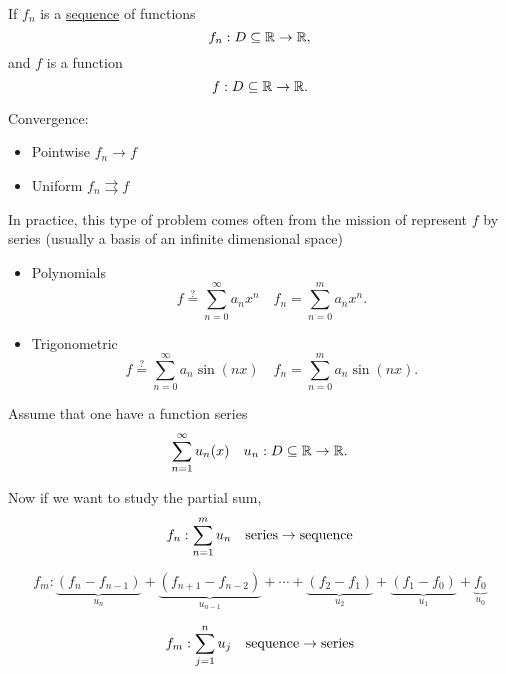 \documentclass[11pt, sakura, night, 0.5in]{hw}
\begin{document}
\coverpage



If $f_n$ is a \underline{sequence} of functions \[f_n: D\subseteq \mathbb{R}\to\mathbb{R},\] and $f$ is a function \[f: D\subseteq \mathbb{R}\to\mathbb{R}.\]

Convergence:
\begin{itemize}
    \item Pointwise $f_n\to f$
    \item Uniform $f_n\rightrightarrows f$
\end{itemize}

In practice, this type of problem comes often from the mission of represent $f$ by series (usually a basis of an infinite dimensional space)


\begin{itemize}
    \item Polynomials \[f \stackrel{?}{=} \sum_{n=0}^\infty a_n x^n\quad f_n = \sum_{n=0}^m a_n x^n.\]
    \item Trigonometric \[f\stackrel{?}{=} \sum_{n=0}^\infty a_n \sin(nx)\quad f_n=\sum_{n=0}^m a_n\sin(nx).\]
\end{itemize}

Assume that one have a function series \[\sum_{n=1}^\infty u_n(x)\quad u_n:D\subseteq\mathbb{R}\to\mathbb{R}.\]

Now if we want to study the partial sum, \[f_n:\sum_{n=1}^m u_n\quad \text{series}\to\text{sequence}\]

\[f_m: \underbrace{(f_n-f_{n-1})}_{u_n} + \underbrace{(f_{n+1}-f_{n-2})}_{u_{n-1}} +\cdots+\underbrace{(f_2-f_1)}_{u_2}+\underbrace{(f_1-f_0)}_{u_1}+\underbrace{f_0}_{u_0}\]

\[f_m:\sum_{j=1}^n u_j\quad\text{sequence}\to\text{series}\]



\end{document}
